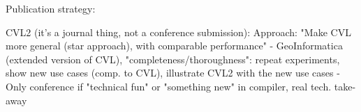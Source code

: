 \documentclass[11pt, oneside]{report}   	%
\begin{document}
Publication strategy:

CVL2 (it's a journal thing, not a conference submission):
Approach: "Make CVL more general (star approach), with comparable performance"
- GeoInformatica (extended version of CVL), "completeness/thoroughness": repeat experiments, show new use cases (comp. to CVL), illustrate CVL2 with the new use cases 
- Only conference if "technical fun" or "something new" in compiler, real tech. take-away
\end{document}
